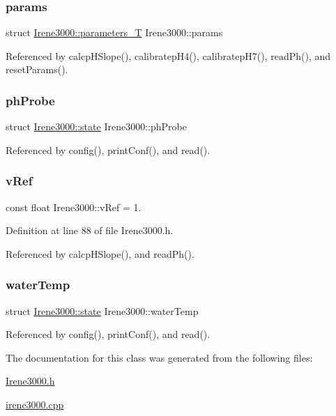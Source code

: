 \subsubsection{\texorpdfstring{params}{params}}
{\footnotesize\ttfamily struct \hyperlink{structIrene3000_1_1parameters__T}{Irene3000\+::parameters\+\_\+T} Irene3000\+::params\hspace{0.3cm}{\ttfamily [private]}}



Referenced by calcp\+H\+Slope(), calibratep\+H4(), calibratep\+H7(), read\+Ph(), and reset\+Params().

\mbox{\label{classIrene3000_a997a4ee466fa1d5416e07e444965dc9e}} 
\subsubsection{\texorpdfstring{ph\+Probe}{phProbe}}
{\footnotesize\ttfamily struct \hyperlink{structIrene3000_1_1state}{Irene3000\+::state}  Irene3000\+::ph\+Probe\hspace{0.3cm}{\ttfamily [private]}}



Referenced by config(), print\+Conf(), and read().

\mbox{\label{classIrene3000_a018e7ff9bee57e6d2b298667a668ba7e}} 
\subsubsection{\texorpdfstring{v\+Ref}{vRef}}
{\footnotesize\ttfamily const float Irene3000\+::v\+Ref = 1.\hspace{0.3cm}{\ttfamily [private]}}



Definition at line 88 of file Irene3000.\+h.



Referenced by calcp\+H\+Slope(), and read\+Ph().

\mbox{\label{classIrene3000_af05612c78c758ce9db316c75ad937130}} 
\subsubsection{\texorpdfstring{water\+Temp}{waterTemp}}
{\footnotesize\ttfamily struct \hyperlink{structIrene3000_1_1state}{Irene3000\+::state}  Irene3000\+::water\+Temp\hspace{0.3cm}{\ttfamily [private]}}



Referenced by config(), print\+Conf(), and read().



The documentation for this class was generated from the following files\+:\begin{DoxyCompactItemize}
\item 
\hyperlink{Irene3000_8h}{Irene3000.\+h}\item 
\hyperlink{irene3000_8cpp}{irene3000.\+cpp}\end{DoxyCompactItemize}
